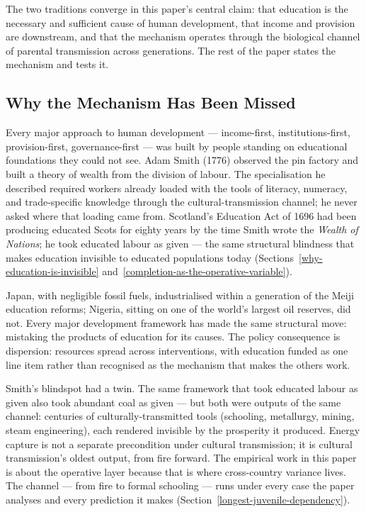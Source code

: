 \documentclass[12pt,letterpaper]{article}
\begin{document}
The two traditions converge in this paper's central claim: that
education is the necessary and sufficient cause of human development,
that income and provision are downstream, and that the mechanism
operates through the biological channel of parental transmission
across generations. The rest of the paper states the mechanism and
tests it.

\subsection{Why the Mechanism Has Been Missed}\label{why-the-mechanism-has-been-missed}

Every major approach to human development --- income-first,
institutions-first, provision-first, governance-first --- was built by
people standing on educational foundations they could not see. Adam
Smith (1776) observed the pin factory and built a theory of wealth
from the division of labour. The specialisation he described required
workers already loaded with the tools of literacy, numeracy, and
trade-specific knowledge through the cultural-transmission channel;
he never asked where that loading came from. Scotland's Education Act
of 1696 had been producing educated Scots for eighty years by the time
Smith wrote the \emph{Wealth of Nations}; he took educated labour as
given --- the same structural blindness that makes education invisible
to educated populations today
(Sections~\ref{why-education-is-invisible}
and~\ref{completion-as-the-operative-variable}).

Japan, with negligible fossil fuels, industrialised within a
generation of the Meiji education reforms; Nigeria, sitting on one of
the world's largest oil reserves, did not. Every major development
framework has made the same structural move: mistaking the products
of education for its causes. The policy consequence is dispersion:
resources spread across interventions, with education funded as one
line item rather than recognised as the mechanism that makes the
others work.

Smith's blindspot had a twin. The same framework that took educated
labour as given also took abundant coal as given --- but both were
outputs of the same channel: centuries of culturally-transmitted
tools (schooling, metallurgy, mining, steam engineering), each
rendered invisible by the prosperity it produced. Energy capture is
not a separate precondition under cultural transmission; it is
cultural transmission's oldest output, from fire forward. The
empirical work in this paper is about the operative layer because
that is where cross-country variance lives. The channel --- from fire
to formal schooling --- runs under every case the paper analyses and
every prediction it makes (Section~\ref{longest-juvenile-dependency}).
\end{document}
